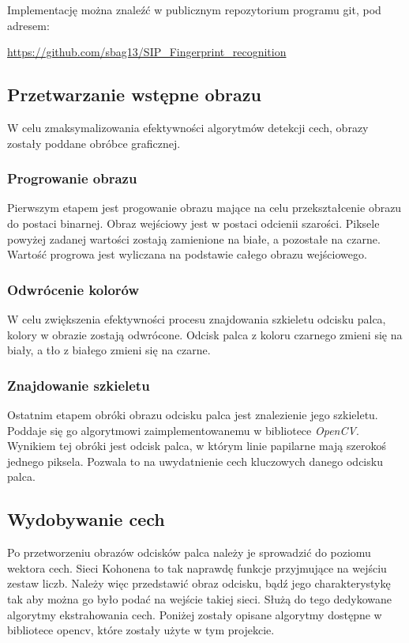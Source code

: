 \documentclass[12pt, notitlepage]{article}
\begin{document}
Implementację można znaleźć w publicznym repozytorium programu git, pod adresem:
\begin{center}
    \url{https://github.com/sbag13/SIP_Fingerprint_recognition}
\end{center}

\subsection{Przetwarzanie wstępne obrazu}\label{sec:preprocesing}
W celu zmaksymalizowania efektywności algorytmów detekcji cech, obrazy zostały poddane obróbce graficznej.

\subsubsection{Progrowanie obrazu}
Pierwszym etapem jest progowanie obrazu mające na celu przekształcenie obrazu do postaci binarnej. Obraz wejściowy jest w postaci odcienii szarości. Piksele powyżej zadanej wartości zostają zamienione na białe, a pozostałe na czarne. Wartość progrowa jest wyliczana na podstawie całego obrazu wejściowego. 

\subsubsection{Odwrócenie kolorów}
W celu zwiększenia efektywności procesu znajdowania szkieletu odcisku palca, kolory w obrazie zostają odwrócone. Odcisk palca z koloru czarnego zmieni się na biały, a tło z białego zmieni się na czarne. 

\subsubsection{Znajdowanie szkieletu}
Ostatnim etapem obróki obrazu odcisku palca jest znalezienie jego szkieletu. Poddaje się go algorytmowi zaimplementowanemu w bibliotece \textit{OpenCV}. Wynikiem tej obróki jest odcisk palca, w którym linie papilarne mają szerokoś jednego piksela. Pozwala to na uwydatnienie cech kluczowych danego odcisku palca.

\subsection{Wydobywanie cech}\label{sec:extraction}

Po przetworzeniu obrazów odcisków palca należy je sprowadzić do poziomu wektora cech. Sieci Kohonena to tak naprawdę funkcje przyjmujące na wejściu zestaw liczb. Należy więc przedstawić obraz odcisku, bądź jego charakterystykę tak aby można go było podać na wejście takiej sieci. Służą do tego dedykowane algorytmy ekstrahowania cech. Poniżej zostały opisane algorytmy dostępne w bibliotece opencv\cite{opencv}, które zostały użyte w tym projekcie.
\end{document}
